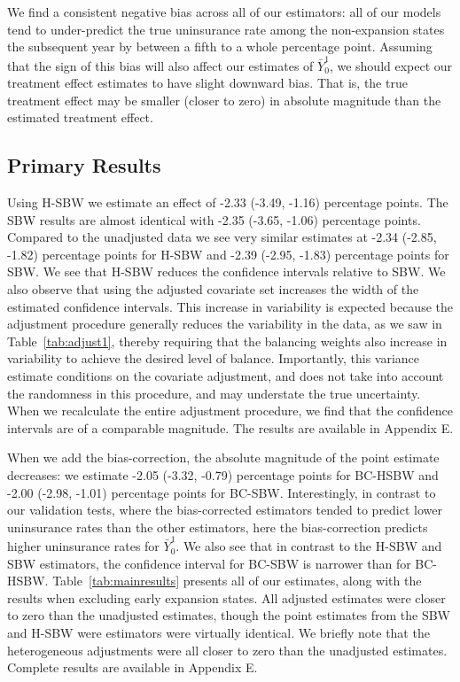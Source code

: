 \documentclass[aoas]{imsart}
\theoremstyle{plain}
\theoremstyle{remark}
\begin{document}
We find a consistent negative bias across all of our estimators: all of our models tend to under-predict the true uninsurance rate among the non-expansion states the subsequent year by between a fifth to a whole percentage point. Assuming that the sign of this bias will also affect our estimates of $\bar{Y}^1_0$, we should expect our treatment effect estimates to have slight downward bias. That is, the true treatment effect may be smaller (closer to zero) in absolute magnitude than the estimated treatment effect. 

\subsection{Primary Results}

Using H-SBW we estimate an effect of -2.33 (-3.49, -1.16) percentage points. The SBW results are almost identical with -2.35 (-3.65, -1.06) percentage points. Compared to the unadjusted data we see very similar estimates at -2.34 (-2.85, -1.82) percentage points for H-SBW and -2.39 (-2.95, -1.83) percentage points for SBW. We see that H-SBW reduces the confidence intervals relative to SBW. We also observe that using the adjusted covariate set increases the width of the estimated confidence intervals. This increase in variability is expected because the adjustment procedure generally reduces the variability in the data, as we saw in Table~\ref{tab:adjust1}, thereby requiring that the balancing weights also increase in variability to achieve the desired level of balance. Importantly, this variance estimate conditions on the covariate adjustment, and does not take into account the randomness in this procedure, and may understate the true uncertainty. When we recalculate the entire adjustment procedure, we find that the confidence intervals are of a comparable magnitude. The results are available in Appendix E.

When we add the bias-correction, the absolute magnitude of the point estimate decreases: we estimate -2.05 (-3.32, -0.79) percentage points for BC-HSBW and -2.00 (-2.98, -1.01) percentage points for BC-SBW. Interestingly, in contrast to our validation tests, where the bias-corrected estimators tended to predict lower uninsurance rates than the other estimators, here the bias-correction predicts higher uninsurance rates for $\bar{Y}^1_0$. We also see that in contrast to the H-SBW and SBW estimators, the confidence interval for BC-SBW is narrower than for BC-HSBW. Table~\ref{tab:mainresults} presents all of our estimates, along with the results when excluding early expansion states. All adjusted estimates were closer to zero than the unadjusted estimates, though the point estimates from the SBW and H-SBW were estimators were virtually identical. We briefly note that the heterogeneous adjustments were all closer to zero than the unadjusted estimates. Complete results are available in Appendix E.
\end{document}
